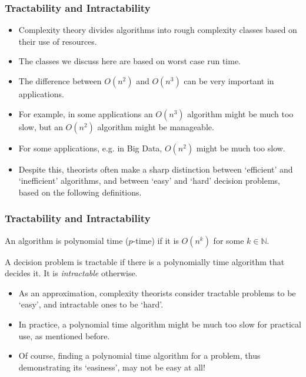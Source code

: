 \documentclass[handout]{beamer}
\begin{document}
\begin{frame}
\frametitle{Tractability and Intractability}
\begin{itemize}
\item Complexity theory divides algorithms into rough complexity classes based on their use of resources. 
\vspace{0.1cm}
\item The classes we discuss here are based on worst case run time. 
\vspace{0.1cm}
\item The difference between $O(n^2)$ and $O(n^3)$ can be very important in applications. 
\vspace{0.1cm}
\item For example, in some applications an $O(n^3)$ algorithm might be much too slow, but an $O(n^2)$ algorithm might be manageable. 
\vspace{0.1cm}
\item For some applications, e.g. in Big Data, $O(n^2)$ might be much too slow. 
\vspace{0.1cm}
\item Despite this, theorists often make a sharp distinction between  `efficient' and `inefficient' algorithms, and between `easy' and `hard' decision problems, based on the following definitions.
\end{itemize}
\end{frame}

\begin{frame}
\frametitle{Tractability and Intractability}
\begin{definition}
An algorithm is polynomial time ($p$-time) if it is $O(n^k)$ for some $k\in\mathbb{N}$.
\end{definition}

\begin{definition}[tractable]
A decision problem is tractable if there is a polynomially time algorithm that decides it. It is \emph{intractable} otherwise. 
\end{definition}
\begin{itemize}
\item As an approximation, complexity theorists consider tractable problems to be `easy', and intractable ones to be `hard'. 
\item In practice, a polynomial time algorithm might be much too slow for practical use, as mentioned before. 
\item Of course, finding a polynomial time algorithm for a problem, thus demonstrating its `easiness', may not be easy at all!
\end{itemize}
\end{frame}
\end{document}
